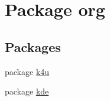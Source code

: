 \hypertarget{namespaceorg}{\section{Package org}
\label{db/d96/namespaceorg}
}
\subsection*{Packages}
\begin{DoxyCompactItemize}
\item 
package \hyperlink{namespaceorg_1_1k4u}{k4u}
\item 
package \hyperlink{namespaceorg_1_1kde}{kde}
\end{DoxyCompactItemize}
